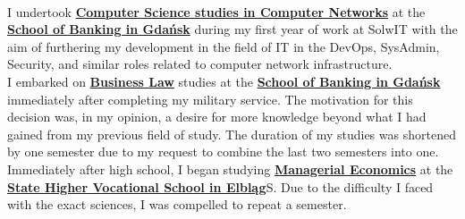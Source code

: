     \begin{rightcolumn}\noindent \small
    \phantom{} \\ %
            {I undertook \href{https://www.merito.pl/gdansk/studia-i-szkolenia/studia-i-stopnia/kierunki-i-specjalnosci/informatyka/inzynieria-sieci-komputerowych}{\textbf{Computer Science studies in Computer Networks}} at the \href{https://www.merito.pl/gdansk/}{\textbf{School of Banking in Gdańsk}} during my first year of work at SolwIT with the aim of furthering my development in the field of IT in the DevOps, SysAdmin, Security, and similar roles related to computer network infrastructure.}
        \vspace{\itemspace}\\
            {I embarked on \href{https://www.merito.pl/gdansk/studia-i-szkolenia/studia-i-stopnia/kierunki-i-specjalnosci/prawo-w-biznesie/prawo-i-zarzadzanie}{\textbf{Business Law}} studies at the \href{https://www.merito.pl/gdansk/}{\textbf{School of Banking in Gdańsk}} immediately after completing my military service. The motivation for this decision was, in my opinion, a desire for more knowledge beyond what I had gained from my previous field of study. The duration of my studies was shortened by one semester due to my request to combine the last two semesters into one.}
        \vspace{\itemspace}\\
            {Immediately after high school, I began studying \href{https://ans-elblag.pl/studia-ekonomia-licencjackie.html}{\textbf{Managerial Economics}} at the \href{https://ans-elblag.pl/}{\textbf{State Higher Vocational School in Elbląg}}S. Due to the difficulty I faced with the exact sciences, I was compelled to repeat a semester.}
        \vspace{\sectionspace}
    \end{rightcolumn} %

